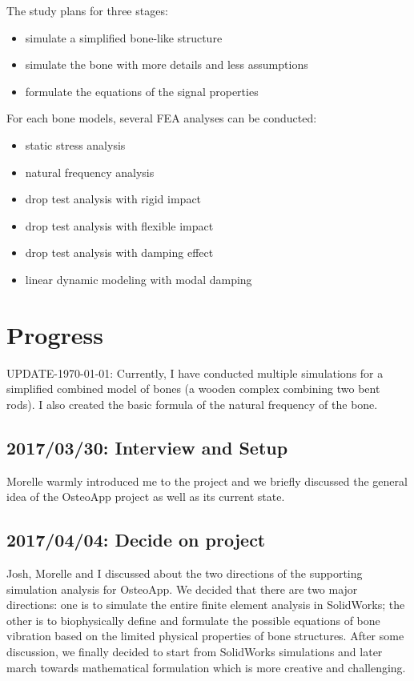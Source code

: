 \documentclass{sigchi}
\begin{document}
The study plans for three stages:
\begin{itemize}
\item simulate a simplified bone-like structure
\item simulate the bone with more details and less assumptions
\item formulate the equations of the signal properties
\newline
\end{itemize}

For each bone models, several FEA analyses can be conducted:
\begin{itemize}
\item static stress analysis
\item natural frequency analysis
\item drop test analysis with rigid impact
\item drop test analysis with flexible impact
\item drop test analysis with damping effect
\item linear dynamic modeling with modal damping 
\end{itemize}

\section{Progress} 

UPDATE-\today: Currently, I have conducted multiple simulations for a simplified combined model of bones (a wooden complex combining two bent rods). I also created the basic formula of the natural frequency of the bone.

\subsection{2017/03/30: Interview and Setup}

Morelle warmly introduced me to the project and we briefly discussed the general idea of the OsteoApp project as well as its current state. 

\subsection{2017/04/04: Decide on project}

Josh, Morelle and I discussed about the two directions of the supporting simulation analysis for OsteoApp. We decided that there are two major directions: one is to simulate the entire finite element analysis in SolidWorks; the other is to biophysically define and formulate the possible equations of bone vibration based on the limited physical properties of bone structures. 
After some discussion, we finally decided to start from SolidWorks simulations and later march towards mathematical formulation which is more creative and challenging.
\end{document}
